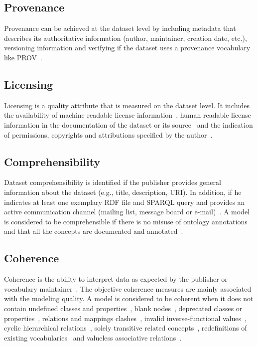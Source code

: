 \subsection{Provenance}
Provenance can be achieved at the dataset level by including metadata that describes its authoritative information (author, maintainer, creation date, etc.), versioning information and verifying if the dataset uses a provenance vocabulary like PROV~\cite{Lebo:W3C:13}.

\subsection{Licensing}
Licensing is a quality attribute that is measured on the dataset level. It includes the availability of machine readable license information~\cite{Hogan:WebSemJorunal:12}, human readable license information in the documentation of the dataset or its source~\cite{Hogan:WebSemJorunal:12} and the indication of permissions, copyrights and attributions specified by the author~\cite{Zaveri:SemWebJorunal:12}.

\subsection{Comprehensibility}
Dataset comprehensibility is identified if the publisher provides general information about the dataset (e.g., title, description, URI). In addition, if he indicates at least one exemplary RDF file and SPARQL query and provides an active communication channel (mailing list, message board or e-mail)~\cite{Flemming:Thesis:10}. A model is considered to be comprehensible if there is no misuse of ontology annotations and that all the concepts are documented and annotated~\cite{Mader:TBDL:12,Maria:KEOD:13}.

\subsection{Coherence}
Coherence is the ability to interpret data as expected by the publisher or vocabulary maintainer~\cite{Hogan:LDOW:10}. The objective coherence measures are mainly associated with the modeling quality. A model is considered to be coherent when it does not contain undefined classes and properties~\cite{Hogan:LDOW:10}, blank nodes~\cite{Hogan:WebSemJorunal:12}, deprecated classes or properties~\cite{Hogan:LDOW:10}, relations and mappings clashes~\cite{Suominen:IKEM:12}, invalid inverse-functional values~\cite{Hogan:LDOW:10}, cyclic hierarchical relations~\cite{Dagobert:DL:02,Suominen:IKEM:12,Mader:TBDL:12}, solely transitive related concepts~\cite{Mader:TBDL:12}, redefinitions of existing vocabularies~\cite{Hogan:LDOW:10} and valueless associative relations~\cite{Mader:TBDL:12}.

